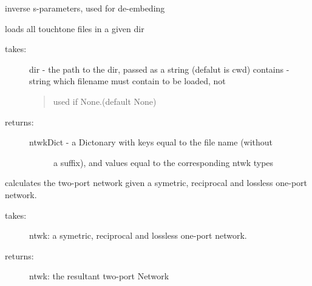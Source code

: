 \documentclass[letterpaper,10pt,english]{sphinxmanual}
\begin{document}

\begin{fulllineitems}
\label{api/mwavepy:mwavepy.network.inv}
inverse s-parameters, used for de-embeding

\end{fulllineitems}


\begin{fulllineitems}
\label{api/mwavepy:mwavepy.network.load_all_touchstones}
loads all touchtone files in a given dir
\begin{description}
\item[{takes:}] \leavevmode
dir  - the path to the dir, passed as a string (defalut is cwd)
contains - string which filename must contain to be loaded, not
\begin{quote}

used if None.(default None)
\end{quote}

\item[{returns:}] \leavevmode\begin{description}
\item[{ntwkDict - a Dictonary with keys equal to the file name (without}] \leavevmode
a suffix), and values equal to the corresponding ntwk types

\end{description}

\end{description}

\end{fulllineitems}


\begin{fulllineitems}
\label{api/mwavepy:mwavepy.network.one_port_2_two_port}
calculates the two-port network given a  symetric, reciprocal and 
lossless one-port network.
\begin{description}
\item[{takes:}] \leavevmode
ntwk: a symetric, reciprocal and lossless one-port network.

\item[{returns:}] \leavevmode
ntwk: the resultant two-port Network

\end{description}

\end{fulllineitems}
\end{document}
